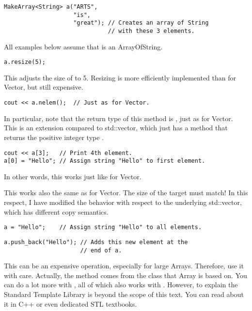 \begin{verbatim}
MakeArray<String> a("ARTS",
                    "is",
                    "great"); // Creates an array of String
                              // with these 3 elements.
\end{verbatim}


All examples below assume that  is an ArrayOfString.

\begin{verbatim}
a.resize(5);
\end{verbatim}

This adjusts the size of  to 5. Resizing is more efficiently
implemented than for Vector, but still expensive.

\begin{verbatim}
cout << a.nelem();  // Just as for Vector.
\end{verbatim}

In particular, note that the return type of this method is
, just as for Vector. This is an extension compared to
std::vector, which just has a method  that returns the
positive integer type .

\begin{verbatim}
cout << a[3];   // Print 4th element.
a[0] = "Hello"; // Assign string "Hello" to first element.
\end{verbatim}

In other words, this works just like for Vector.


This works also the same as for Vector. The size of the target must
match! In this respect, I have modified the behavior with respect to
the underlying std::vector, which has different copy semantics.

\begin{verbatim}
a = "Hello";    // Assign string "Hello" to all elements.
\end{verbatim}

\begin{verbatim}
a.push_back("Hello"); // Adds this new element at the
                      // end of a.
\end{verbatim}

This can be an expensive operation, especially for large Arrays.
Therefore, use it with care. Actually, the  method
comes from the  class that Array is based on. You
can do a lot more with , all of which also works
with . However, to explain the Standard Template Library
is beyond the scope of this text. You can read about it in C++ or even
dedicated STL textbooks.



